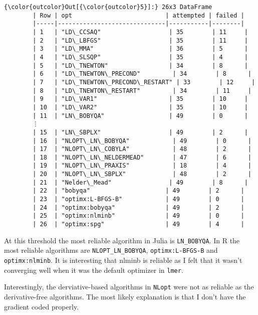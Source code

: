 \documentclass{article}
\begin{document}
            \begin{Verbatim}[commandchars=\\\{\}]
{\color{outcolor}Out[{\color{outcolor}5}]:} 26x3 DataFrame
        | Row | opt                          | attempted | failed |
        |-----|------------------------------|-----------|--------|
        | 1   | "LD\_CCSAQ"                   | 35        | 11     |
        | 2   | "LD\_LBFGS"                   | 35        | 11     |
        | 3   | "LD\_MMA"                     | 36        | 5      |
        | 4   | "LD\_SLSQP"                   | 35        | 4      |
        | 5   | "LD\_TNEWTON"                 | 34        | 8      |
        | 6   | "LD\_TNEWTON\_PRECOND"         | 34        | 8      |
        | 7   | "LD\_TNEWTON\_PRECOND\_RESTART" | 33        | 12     |
        | 8   | "LD\_TNEWTON\_RESTART"         | 34        | 11     |
        | 9   | "LD\_VAR1"                    | 35        | 10     |
        | 10  | "LD\_VAR2"                    | 35        | 10     |
        | 11  | "LN\_BOBYQA"                  | 49        | 0      |
        ⋮
        | 15  | "LN\_SBPLX"                   | 49        | 2      |
        | 16  | "NLOPT\_LN\_BOBYQA"            | 49        | 0      |
        | 17  | "NLOPT\_LN\_COBYLA"            | 48        | 2      |
        | 18  | "NLOPT\_LN\_NELDERMEAD"        | 47        | 6      |
        | 19  | "NLOPT\_LN\_PRAXIS"            | 18        | 4      |
        | 20  | "NLOPT\_LN\_SBPLX"             | 48        | 2      |
        | 21  | "Nelder\_Mead"                | 49        | 8      |
        | 22  | "bobyqa"                     | 49        | 2      |
        | 23  | "optimx:L-BFGS-B"            | 49        | 0      |
        | 24  | "optimx:bobyqa"              | 49        | 2      |
        | 25  | "optimx:nlminb"              | 49        | 0      |
        | 26  | "optimx:spg"                 | 49        | 4      |
\end{Verbatim}
        
    At this threshold the most reliable algorithm in Julia is
\texttt{LN\_BOBYQA}. In R the most reliable algorithms are
\texttt{NLOPT\_LN\_BOBYQA}, \texttt{optimx:L-BFGS-B} and
\texttt{optimx:nlminb}. It is interesting that nlminb is reliable as I
felt that it wasn't converging well when it was the default optimizer in
\texttt{lmer}.

Interestingly, the derviative-based algorithms in \texttt{NLopt} were
not as reliable as the derivative-free algorithms. The most likely
explanation is that I don't have the gradient coded properly.
\end{document}
